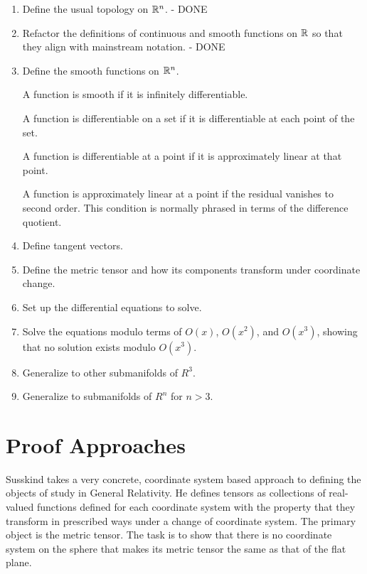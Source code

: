 \documentclass[11pt, oneside]{article}
\begin{document}
\begin{enumerate}

\item Define the usual topology on $\mathbb{R}^n$. - DONE

\item Refactor the definitions of continuous and smooth functions on $\mathbb{R}$ so that they align with mainstream notation. - DONE

\item Define the smooth functions on $\mathbb{R}^n$.

A function is smooth if it is infinitely differentiable.

A function is differentiable on a set if it is differentiable at each point of the set.

A function is differentiable at a point if it is approximately linear at that point.

A function is approximately linear at a point if the residual vanishes to second order.
This condition is normally phrased in terms of the difference quotient.

\item Define tangent vectors.

\item Define the metric tensor and how its components transform under coordinate change.

\item Set up the differential equations to solve.

\item Solve the equations modulo terms of $O(x)$, $O(x^2)$, and $O(x^3)$, showing that no solution exists
modulo $O(x^3)$.

\item Generalize to other submanifolds of $R^3$.

\item Generalize to submanifolds of $R^n$ for $n > 3$.

\end{enumerate}

\section{Proof Approaches}

Susskind takes a very concrete, coordinate system based approach to defining the objects of study in General Relativity.
He defines tensors as collections of real-valued functions defined for each coordinate system with the property that they
transform in prescribed ways under a change of coordinate system.
The primary object is the metric tensor.
The task is to show that there is no coordinate system on the sphere that makes its metric tensor the same as that of the flat plane.
\end{document}
